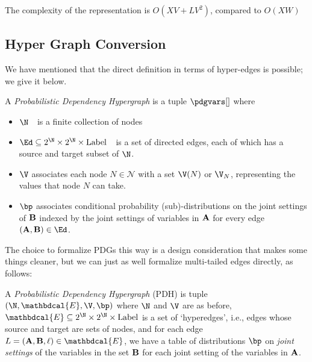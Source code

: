 {{The complexity of the representation is $O(XV + L V^2)$, compared to $O(XW)$}

\subsection{Hyper Graph Conversion}\label{sec:hyper-convert}
We have mentioned that the direct definition in terms of hyper-edges is possible; we give it below.

\begin{defn}[PDH]\label{def:hypermodel}
	A \emph{Probabilistic Dependency Hypergraph} is a tuple $\pdgvars[]$ where
	\begin{itemize}[nosep]
		\item $\N$~~is a finite collection of nodes
		\item $\Ed \subseteq 2^{\N} \times 2^{\N} \times \mathrm{Label}$~~is a set of directed edges, each of which has a source and target subset of $\N$.
		\item $\V$ associates each node $N \in \mathcal N$ with a set $\V(N)$ or $\V_N$, representing the values that node $N$ can take.
		\item $\bp$
		associates conditional probability (sub)-distributions on the joint settings of $\bf B$ indexed by the joint settings of variables in $\bf A$ for every edge $({\bf A,B}) \in \Ed$. %
	\end{itemize}
\end{defn}

	
The choice to formalize PDGs this way is a design consideration that makes some things cleaner, but we can just as well formalize multi-tailed edges directly, as follows:

\begin{defn}[PDH]\label{def:modelhyper}
A \textit{Probabilistic Dependency Hypergraph} (PDH) is tuple $(\N,
\mathbdcal{E}, \V, \bp)$ where $\N$ and $\V$ are as before, $\mathbdcal{E}
\subseteq 2^\N \times 2^\N \times \mathrm{Label}$ is a set of `hyperedges',
i.e., edges whose source and target are sets of nodes, and for each edge $L
= ({\bf A, B}, \ell) \in \mathbdcal{E}$, we have a table of distributions
$\bp$ on \emph{joint settings} of the variables in the set $\bf B$ for each
joint setting of the variables in $\bf A$.
\end{defn}

}
